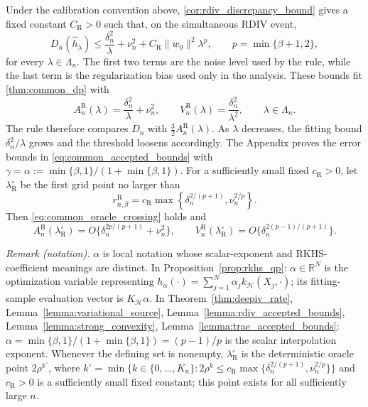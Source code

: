 \documentclass[12pt]{article}
\theoremstyle{plain}
\theoremstyle{definition}
\theoremstyle{remark}
\begin{document}
Under the calibration convention above, \cref{cor:rdiv_discrepancy_bound} gives a fixed constant $C_{\mathrm R}>0$ such that, on the simultaneous RDIV event,
\begin{equation}\label{eq:rdiv_discrepancy_bound}
D_n(\hat h_\lambda)
\leqslant
\frac{\delta_n^2}{\lambda}+\nu_n^2
+C_{\mathrm R}\|w_0\|^2\lambda^p,
\qquad
p=\min\{\beta+1,2\},
\end{equation}
for every $\lambda\in\Lambda_n$. The first two terms are the noise level used by the rule, while the last term is the regularization bias used only in the analysis.
These bounds fit \cref{thm:common_dp} with
\begin{equation}\label{eq:rdiv_common_scales}
A_n^{\mathrm R}(\lambda)
=\frac{\delta_n^2}{\lambda}+\nu_n^2,
\qquad
V_n^{\mathrm R}(\lambda)
=\frac{\delta_n^2}{\lambda^2},
\qquad \lambda\in\Lambda_n.
\end{equation}
The rule therefore compares $D_n$ with $\tfrac32A_n^{\mathrm R}(\lambda)$. As $\lambda$ decreases, the fitting bound $\delta_n^2/\lambda$ grows and the threshold loosens accordingly.
The Appendix proves the error bounds in
\eqref{eq:common_accepted_bounds} with $\gamma=\alpha:=\min\{\beta,1\}/(1+\min\{\beta,1\})$. For a sufficiently small fixed
$c_{\mathrm R}>0$, let $\lambda_{\mathrm R}^\circ$ be the first grid point no larger than
\[
r_{n,\beta}^{\mathrm R} =c_{\mathrm R}\max\left\{ \delta_n^{2/(p+1)},\nu_n^{2/p} \right\}.
\]
Then \eqref{eq:common_oracle_crossing} holds and
\begin{equation}\label{eq:rdiv_oracle_scales}
A_n^{\mathrm R}(\lambda_{\mathrm R}^\circ)=O\{\delta_n^{2p/(p+1)}+\nu_n^2\},
\qquad
V_n^{\mathrm R}(\lambda_{\mathrm R}^\circ)=O\{\delta_n^{2(p-1)/(p+1)}\}.
\end{equation}

\noindent\textit{Remark (notation).} $\alpha$ is local notation whose scalar-exponent and RKHS-coefficient meanings are distinct. In Proposition~\ref{prop:rkhs_qp}: $\alpha\in\mathbb R^N$ is the optimization variable representing $h_\alpha(\cdot)=\sum_{j=1}^N\alpha_j k_{\mathcal H}(X_j,\cdot)$; its fitting-sample evaluation vector is $K_{\mathcal H}\alpha$. In Theorem~\ref{thm:deepiv_rate}, Lemma~\ref{lemma:variational_source}, Lemma~\ref{lemma:rdiv_accepted_bounds}, Lemma~\ref{lemma:strong_convexity}, Lemma~\ref{lemma:trae_accepted_bounds}: $\alpha=\min\{\beta,1\}/(1+\min\{\beta,1\})=(p-1)/p$ is the scalar interpolation exponent. Whenever the defining set is nonempty, $\lambda_{\mathrm R}^\circ$ is the deterministic oracle point $2\rho^{k^\circ}$, where $k^\circ=\min\{k\in\{0,\ldots,K_n\}:2\rho^k\leqslant c_{\mathrm R}\max\{\delta_n^{2/(p+1)},\nu_n^{2/p}\}\}$ and $c_{\mathrm R}>0$ is a sufficiently small fixed constant; this point exists for all sufficiently large $n$.
\end{document}

